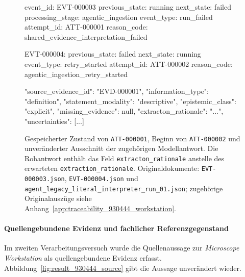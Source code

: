 \begin{figure}[htbp]
    \centering
    \begin{minipage}{0.94\textwidth}
        \begin{evidencebox}
event_id:         EVT-000003
previous_state:   running
next_state:       failed
processing_stage: agentic_ingestion
event_type:       run_failed
attempt_id:       ATT-000001
reason_code:      shared_evidence_interpretation_failed

EVT-000004:
previous_state:   failed
next_state:       running
event_type:       retry_started
attempt_id:       ATT-000002
reason_code:      agentic_ingestion_retry_started
        \end{evidencebox}

        \begin{evidencebox}
{
  "source_evidence_id": "EVD-000001",
  "information_type": "definition",
  "statement_modality": "descriptive",
  "epistemic_class": "explicit",
  "missing_evidence": null,
  "extracton_rationale": "...",
  "uncertainties": [...]
}
        \end{evidencebox}
    \end{minipage}
    \caption[Verarbeitungszustände zweier aufeinanderfolgender Versuche]{
    Gespeicherter Zustand von \texttt{ATT-000001}, Beginn von
    \texttt{ATT-000002} und unveränderter Ausschnitt der zugehörigen
    Modellantwort. Die Rohantwort enthält das Feld
    \texttt{extracton\_rationale} anstelle des erwarteten
    \texttt{extraction\_rationale}. Originaldokumente:
    \texttt{EVT-000003.json}, \texttt{EVT-000004.json} und
    \texttt{agent\_legacy\_literal\_interpreter\_run\_01.json};
    zugehörige Originalauszüge siehe
    Anhang~\ref{app:traceability_930444_workstation}.}
    \label{fig:result_930444_failed_attempt}
\end{figure}

\paragraph{Quellengebundene Evidenz und fachlicher Referenzgegenstand}

Im zweiten Verarbeitungsversuch wurde die Quellenaussage zur
\emph{Microscope Workstation} als quellengebundene Evidenz erfasst.
Abbildung~\ref{fig:result_930444_source} gibt die Aussage unverändert
wieder.

